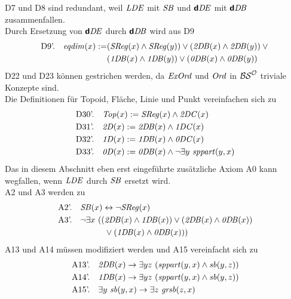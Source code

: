 D7 und D8 sind redundant, weil $\mathit{LDE}$ mit $\mathit{S\hspace*{-0.25ex}B}$ und $\mathit{\boldsymbol{\mathsf{d}}D\hspace*{-0.25ex} E}$ mit $\mathit{\boldsymbol{\mathsf{d}}D\hspace*{-0.25ex} B}$ zusammenfallen.\\
Durch Ersetzung von $\mathit{\boldsymbol{\mathsf{d}}D\hspace*{-0.25ex} E}$ durch $\mathit{\boldsymbol{\mathsf{d}}D\hspace*{-0.25ex} B}$ wird aus D9
\begin{align*}
 \text{D9'.} \quad \mathit{eqdim}(x) := 
      &(\mathit{S\hspace*{-0.25ex}Reg}(x) \wedge \mathit{S\hspace*{-0.25ex}Reg}(y)) \vee (\mathit{2D\hspace*{-0.25ex} B}(x) \wedge \mathit{2D\hspace*{-0.25ex} B}(y)) \vee \mbox{} \\ 
			&(\mathit{1D\hspace*{-0.25ex} B}(x) \wedge \mathit{1D\hspace*{-0.25ex} B}(y)) \vee (\mathit{0D\hspace*{-0.25ex} B}(x) \wedge \mathit{0D\hspace*{-0.25ex} B}(y))
\end{align*}
%
D22 und D23 können gestrichen werden, da $\mathit{ExOrd}$ und $\mathit{Ord}$  in $\mathcal{BS}^{\mathcal{O}}$ triviale Konzepte sind.\\
%
Die Definitionen für Topoid, Fläche, Linie und Punkt vereinfachen sich zu  
%
\begin{align*}
 &\text{D30'.} \quad \GTop(x) := \GSReg(x) \wedge \GtwoDC(x)\\
 &\text{D31'.} \quad \GtwoD(x) := \GtwoDB(x) \wedge \GoneDC(x)\\
 &\text{D32'.} \quad \GoneD(x) := \GoneDB(x) \wedge \GzeroDC(x) \\
 &\text{D33'.} \quad \GzeroD(x) := \GzeroDB(x) \wedge \neg \exists y\ \Gsppart(y,x)
\end{align*}
%
%
Das in diesem Abschnitt eben erst eingeführte zusätzliche Axiom A0 kann wegfallen, wenn $\mathit{LDE}$ durch $\mathit{S\hspace*{-0.25ex}B}$ ersetzt wird.\\
%
A2 und A3 werden zu
\begin{align*}
 &\text{A2'.} \quad \GSB(x) \leftrightarrow \neg \GSReg(x)\\
 &\text{A3'.} \quad \neg \exists x\ ((\GtwoDB(x) \wedge \GoneDB(x)) \vee (\GtwoDB(x) \wedge \GzeroDB(x))\\
 &\phantom{\text{A3'.} \quad \neg \exists x\ ((} \vee (\GoneDB(x) \wedge \GzeroDB(x)))
\end{align*}
%
A13 und A14 müssen modifiziert werden und A15 vereinfacht sich zu
\begin{align*}
 &\text{A13'.} \quad \mathit{2D\hspace*{-0.25ex} B}(x) \to \exists yz\ (\mathit{sppart}(y,x) \wedge \mathit{sb}(y,z))\\
 &\text{A14'.} \quad \mathit{1D\hspace*{-0.25ex} B}(x) \to \exists yz\ (\mathit{sppart}(y,x) \wedge \mathit{sb}(y,z))\\
 &\text{A15'.} \quad \exists y\ \mathit{sb}(y,x) \to \exists z\ \mathit{gr\hspace*{-0.25ex}sb}(z,x)
\end{align*}
